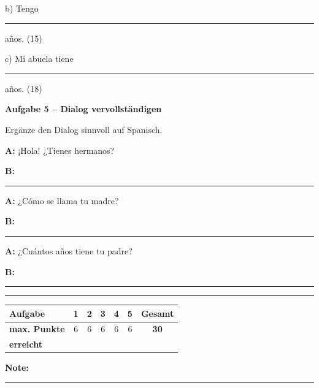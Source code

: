 \documentclass[11pt, a4paper]{article}
\newcommand{\fachfarbe}{spanisch}
\newcommand{\punktebox}[1]{\hfill\fbox{\small \_/#1}}
\newcommand{\luecke}[1]{\rule{#1}{0.4pt}}
\newenvironment{aufgabe}[1]{%
    \needspace{5\baselineskip}%
    \nopagebreak[4]%
    \vspace{10pt}
    \noindent\textbf{\textcolor{\fachfarbe}{Aufgabe #1}}
    \nopagebreak[4]%
    \vspace{5pt}
    \nopagebreak[4]%
    \begin{list}{}{\leftmargin=0pt}
    \item[]
}{%
    \end{list}
}
\begin{document}
\vspace{0.8em}

\noindent
b) Tengo \luecke{3.5cm} años. \hfill (15)

\vspace{0.8em}

\noindent
c) Mi abuela tiene \luecke{3.5cm} años. \hfill (18)

\vspace{15pt}


\begin{aufgabe}{5 -- Dialog vervollständigen}
Ergänze den Dialog sinnvoll auf Spanisch. \punktebox{6}
\end{aufgabe}

\noindent
\textbf{A:} ¡Hola! ¿Tienes hermanos?

\vspace{0.8em}

\noindent
\textbf{B:} \luecke{8cm}

\vspace{0.8em}

\noindent
\textbf{A:} ¿Cómo se llama tu madre?

\vspace{0.8em}

\noindent
\textbf{B:} \luecke{8cm}

\vspace{0.8em}

\noindent
\textbf{A:} ¿Cuántos años tiene tu padre?

\vspace{0.8em}

\noindent
\textbf{B:} \luecke{8cm}


\vspace{25pt}
\hrule
\vspace{10pt}

\noindent
\begin{tabularx}{\textwidth}{|X|c|c|c|c|c||c|}
\hline
\textbf{Aufgabe} & 1 & 2 & 3 & 4 & 5 & \textbf{Gesamt} \\
\hline
\textbf{max. Punkte} & 6 & 6 & 6 & 6 & 6 & \textbf{30} \\
\hline
\textbf{erreicht} & & & & & & \\[0.8em]
\hline
\end{tabularx}

\vspace{10pt}

\begin{flushright}
\textbf{Note:} \luecke{2cm}
\end{flushright}
\end{document}
